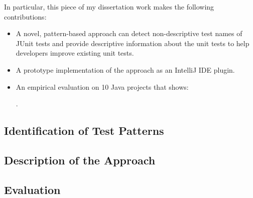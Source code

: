 In particular, this piece of my dissertation work makes the following contributions:
\begin{itemize}
  \item A novel, pattern-based approach can detect non-descriptive test names of JUnit tests and provide descriptive information about the unit tests to help developers improve existing unit tests.
  \item A prototype implementation of the approach as an IntelliJ IDE plugin.
  \item An empirical evaluation on \num{10} Java projects that shows:
      .
\end{itemize}


\subsection{Identification of Test Patterns}
\label{sec:test_patterns}

\subsection{Description of the Approach}
\label{sec:approach-pattern}

\subsection{Evaluation}
\label{sec:evaluation-pattern}
